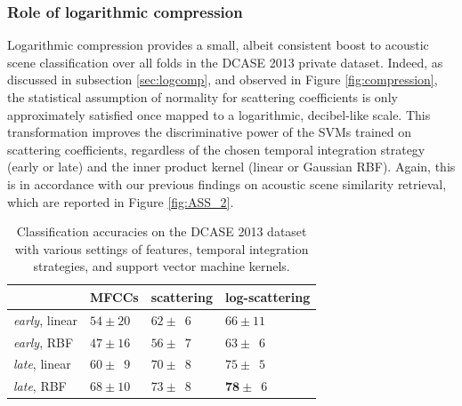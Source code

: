 \documentclass[journal]{IEEEtran}
\begin{document}
\subsubsection*{Role of logarithmic compression}

Logarithmic compression provides a small, albeit consistent boost to acoustic scene classification over all folds in the DCASE 2013 private dataset.
Indeed, as discussed in subsection \ref{sec:logcomp}, and observed in Figure \ref{fig:compression}, the statistical assumption of normality for scattering coefficients is only approximately satisfied once mapped to a logarithmic, decibel-like scale. This transformation improves the discriminative power of the SVMs trained on scattering coefficients, regardless of the chosen temporal integration strategy (early or late) and the inner product kernel (linear or Gaussian RBF).
Again, this is in accordance with our previous findings on acoustic scene similarity retrieval, which are reported in Figure \ref{fig:ASS_2}.


\begin{table}
\begin{center}
\caption{
\label{table:dcase2013}
Classification accuracies on the DCASE 2013 dataset with various settings of features, temporal integration strategies, and support vector machine kernels.
}
\begin{tabular}{llll}
             & MFCCs         & scattering & log-scattering  \\
             \hline
\emph{early}, linear  & $54\pm20$   & $62\pm\phantom{0}6$  & $66\pm11$     \\
\emph{early}, RBF     & $47\pm16$  & $56\pm\phantom{0}7$  & $63\pm\phantom{0}6$   \\
\emph{late}, linear  & $60\pm\phantom{0}9$ & $70\pm\phantom{0}8$  & $75\pm\phantom{0}5$   \\
\emph{late}, RBF     & $68\pm10$ & $73\pm\phantom{0}8$  & $\mathbf{78}\pm\phantom{0}6$   \\
\end{tabular}
\end{center}
\end{table}
\end{document}
